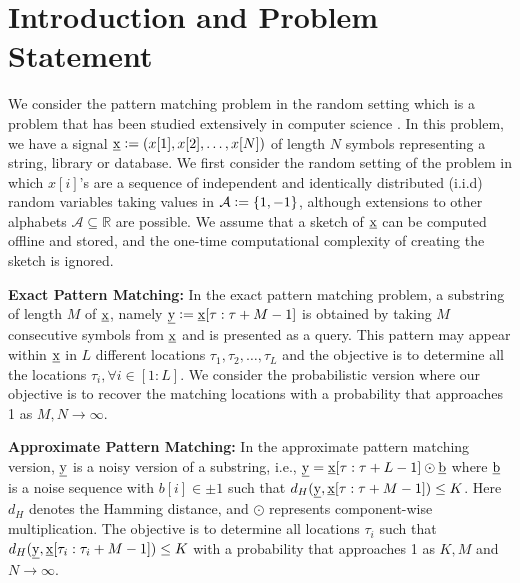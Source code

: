 \section{Introduction and Problem Statement}
\label{sec:introduction}
We consider the pattern matching problem in the random setting which is a problem that has been studied extensively in computer science \cite{}. In this problem, we have a signal $\underline{\mathrm{x}} \mathrel{\mathop:}= (x[1], x[2],\ldots, x[N])$ of length $N$ symbols representing a string, library or database. We first consider the random setting of the problem in which $x[i]$'s are a sequence of independent and identically distributed (i.i.d) random variables taking values in $\mathcal{A} \mathrel{\mathop:}= \{1,-1\}$, although extensions to other alphabets $\mathcal{A} \subseteq \mathbb{R}$ are possible. We assume that a sketch of $\underline{\mathrm{x}}$ can be computed offline and stored, and the one-time computational complexity of creating the sketch is ignored.

{\bf Exact Pattern Matching:} In the exact pattern matching problem, a substring of length $M$ of $\underline{\mathrm{x}}$, namely $\underline{\mathrm{y}} \mathrel{\mathop:}= \underline{\mathrm{x}}[\tau:\tau+M-1]$ is obtained by taking $M$ consecutive symbols from $\underline{\mathrm{x}}$ and is presented as a query. This pattern may appear within $\underline{\mathrm{x}}$ in $L$ different locations $\tau_1,\tau_2,\ldots,\tau_L$ and the objective is to determine all the locations $\tau_i, \forall i\in[1:L]$. We consider the probabilistic version where our objective is to recover the matching locations with a probability that approaches 1 as $M,N \rightarrow \infty$.

{\bf Approximate Pattern Matching:} In the approximate pattern matching version, $\underline{\mathrm{y}}$ is a noisy version of a substring, i.e., $\underline{\mathrm{y}} = \underline{\mathrm{x}}[\tau:\tau+L-1] \odot \underline{\mathrm{b}}$ where $\underline{\mathrm{b}}$ is a noise sequence with $b[i] \in \pm 1$ such that $d_H(\underline{\mathrm{y}},\underline{\mathrm{x}}[\tau:\tau+M-1]) \leq K$. Here $d_H$ denotes the Hamming distance, and $\odot$ represents component-wise multiplication. The objective is to determine all locations $\tau_i$ such that $d_H(\underline{\mathrm{y}},\underline{\mathrm{x}}[\tau_i:\tau_i+M-1]) \leq K$ with a probability that approaches 1 as $K, M$ and $N \rightarrow \infty$.

